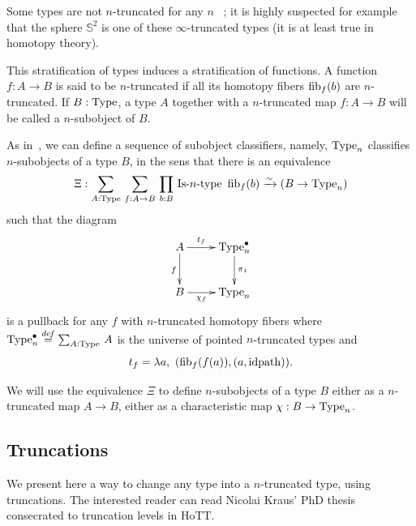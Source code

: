\begin{rmq}
Some types are not $n$-truncated for any
$n$~\cite[Example 8.8.6]{hottbook} ; it is highly suspected for
example that the sphere $\mathbb S^2$ is one of
these $\infty$-truncated types (it is at least true in homotopy theory).  
\end{rmq}


This stratification of types induces a stratification of functions. A
function $f:A\to B$ is said to be $n$-truncated if all its homotopy
fibers $\mathrm{fib}_{f}(b)$ are $n$-truncated. If $B:\operatorname{Type}$, a type $A$ together
with a $n$-truncated map $f:A\to B$ will be called a $n$-subobject of $B$.

As in~\cite{sets_in_hott}, we can define a sequence of subobject
classifiers, namely, $\operatorname{Type}_n$ classifies $n$-subobjects of a type
$B$, in the sens that there is an equivalence
\[\Xi : \sum_{A:\operatorname{Type}}\, \sum_{f:A\to B}\, \prod_{b:B}\, \mathop{\mathrm{Is{\hbox{-}}}n\mathrm{{\hbox{-}} type}}\
\mathrm{fib}_{f}(b) \xrightarrow{\sim} 
 (B \to \operatorname{Type}_n)\]
such that the diagram
\[
\xymatrix{
  A \ar[r]^{\hspace{-1em} t_f} \ar[d]_f & \Type_n^\bullet \ar[d]^{\pi_1}\\
  B \ar[r]_{\hspace{-1em} \chi_f} & \Type_n
}
\]
is a pullback for any $f$ with
 $n$-truncated homotopy fibers where $\operatorname{Type}_n^\bullet \overset{de\hspace{-0.2ex}f}{=}
 \sum_{A:\operatorname{Type}}\, A$ is the universe of pointed
$n$-truncated types and 
\[ t_f = \lambda a,~(\mathrm{fib}_{f}(f(a)),(a,\mathrm{idpath})). \]

We will use the equivalence $\Xi$ to define $n$-subobjects of a type
$B$ either as a $n$-truncated map $A\to B$, either as a characteristic
map $\chi:B\to\operatorname{Type}_n$.
\subsection{Truncations}
\label{ssec:trunc}

We present here a way to change any type into a $n$-truncated type, using
truncations. The interested reader can read Nicolai Kraus' PhD
thesis~\cite{phdkraus} consecrated to truncation levels in HoTT.

